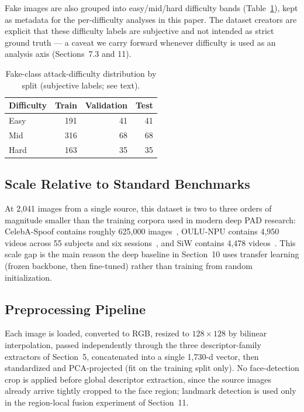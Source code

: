 \documentclass[11pt]{article}
\begin{document}
Fake images are also grouped into easy/mid/hard difficulty bands (Table~\ref{tab:difficulty}), kept as metadata for the per-difficulty analyses in this paper. The dataset creators are explicit that these difficulty labels are subjective and not intended as strict ground truth --- a caveat we carry forward whenever difficulty is used as an analysis axis (Sections~7.3 and 11).

\begin{table}[htbp]
\centering
\caption{Fake-class attack-difficulty distribution by split (subjective labels; see text).}
\label{tab:difficulty}
\begin{tabular}{lrrr}
\toprule
Difficulty & Train & Validation & Test \\
\midrule
Easy & 191 & 41 & 41 \\
Mid & 316 & 68 & 68 \\
Hard & 163 & 35 & 35 \\
\bottomrule
\end{tabular}
\end{table}

\subsection{Scale Relative to Standard Benchmarks}

At 2,041 images from a single source, this dataset is two to three orders of magnitude smaller than the training corpora used in modern deep PAD research: CelebA-Spoof contains roughly 625,000 images~\cite{wang2020}, OULU-NPU contains 4,950 videos across 55 subjects and six sessions~\cite{boulkenafet2017}, and SiW contains 4,478 videos~\cite{liu2018}. This scale gap is the main reason the deep baseline in Section~10 uses transfer learning (frozen backbone, then fine-tuned) rather than training from random initialization.

\subsection{Preprocessing Pipeline}

Each image is loaded, converted to RGB, resized to $128\times128$ by bilinear interpolation, passed independently through the three descriptor-family extractors of Section~5, concatenated into a single 1,730-d vector, then standardized and PCA-projected (fit on the training split only). No face-detection crop is applied before global descriptor extraction, since the source images already arrive tightly cropped to the face region; landmark detection is used only in the region-local fusion experiment of Section~11.
\end{document}
